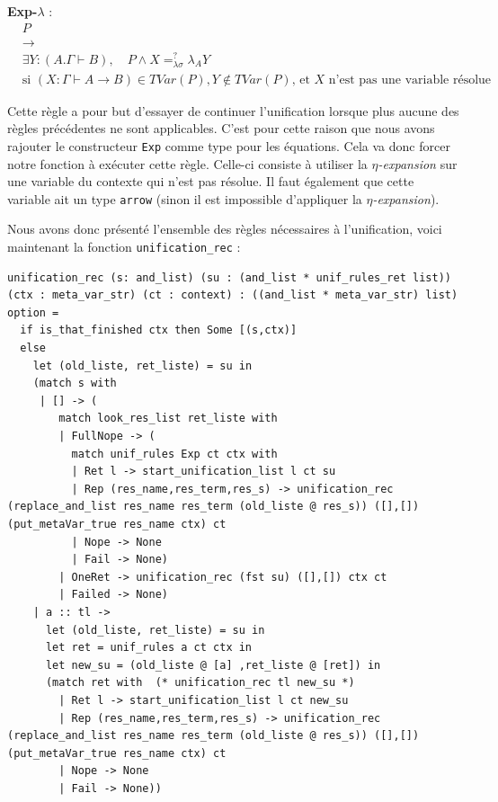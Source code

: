 \textbf{Exp-$\lambda$} :
\begin{align*}
    &P \\
    &\xrightarrow{} \\
    &\exists Y : (A . \Gamma \vdash B), \quad P \wedge X =_{\lambda \sigma}^{?} \lambda_A Y  \\
    &\text{si $(X : \Gamma \vdash A \xrightarrow{} B) \in TVar(P), Y \notin TVar(P)$, et $X$ n'est pas une variable résolue}
\end{align*}

Cette règle a pour but d'essayer de continuer l'unification lorsque plus aucune des règles précédentes ne sont applicables. C'est pour cette raison que nous avons rajouter le constructeur \verb|Exp| comme type pour les équations. Cela va donc forcer notre fonction à exécuter cette règle.
Celle-ci consiste à utiliser la \textit{$\eta$-expansion} sur une variable du contexte qui n'est pas résolue. Il faut également que cette variable ait un type \verb|arrow| (sinon il est impossible d'appliquer la \textit{$\eta$-expansion}).

Nous avons donc présenté l'ensemble des règles nécessaires à l'unification, voici maintenant la fonction \verb|unification_rec| : 
\newpage
\begin{lstlisting}
unification_rec (s: and_list) (su : (and_list * unif_rules_ret list)) (ctx : meta_var_str) (ct : context) : ((and_list * meta_var_str) list) option =
  if is_that_finished ctx then Some [(s,ctx)]
  else
    let (old_liste, ret_liste) = su in
    (match s with
     | [] -> (
        match look_res_list ret_liste with 
        | FullNope -> (
          match unif_rules Exp ct ctx with
          | Ret l -> start_unification_list l ct su
          | Rep (res_name,res_term,res_s) -> unification_rec (replace_and_list res_name res_term (old_liste @ res_s)) ([],[]) (put_metaVar_true res_name ctx) ct 
          | Nope -> None
          | Fail -> None)                           
        | OneRet -> unification_rec (fst su) ([],[]) ctx ct
        | Failed -> None)
    | a :: tl ->
      let (old_liste, ret_liste) = su in
      let ret = unif_rules a ct ctx in
      let new_su = (old_liste @ [a] ,ret_liste @ [ret]) in
      (match ret with  (* unification_rec tl new_su *)
        | Ret l -> start_unification_list l ct new_su
        | Rep (res_name,res_term,res_s) -> unification_rec (replace_and_list res_name res_term (old_liste @ res_s)) ([],[]) (put_metaVar_true res_name ctx) ct 
        | Nope -> None
        | Fail -> None))
\end{lstlisting}